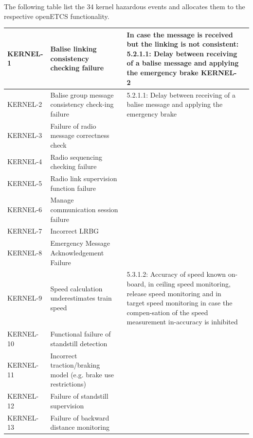 \documentclass{template/openetcs_report}
\begin{document}
The following table list the 34 kernel hazardous events and allocates them to the respective openETCS functionality. 


\begin{center}
\label{tab:KernelHaz}
\tablelasttail{\hline}

\begin{supertabular}[t]{|p{2cm}|p{4cm}|p{4cm}|p{4cm}|}
\hline KERNEL-1 & Balise linking consistency checking failure & In case the message is received but the linking is not consistent:
5.2.1.1: Delay between receiving of a balise message and applying the emergency brake
KERNEL-2 &  \\ 
\hline KERNEL-2 & Balise group message consistency check-ing failure  & 5.2.1.1: Delay between receiving of a balise message and applying the emergency brake &  \\ 
\hline KERNEL-3 & Failure of radio message correctness check &  &  \\ 
\hline KERNEL-4 & Radio sequencing checking failure &  &  \\ 
\hline KERNEL-5 & Radio link supervision function failure &  &  \\ 
\hline KERNEL-6 & Manage communication session failure &  &  \\ 
\hline KERNEL-7 & Incorrect LRBG &  &  \\ 
\hline KERNEL-8 & Emergency Message Acknowledgement Failure &  &  \\ 
\hline KERNEL-9 & Speed calculation underestimates train speed & 5.3.1.2: Accuracy of speed known on-board, in ceiling speed monitoring, release speed monitoring and in target speed monitoring in case the compen-sation of the speed measurement in-accuracy is inhibited  &  \\ 
\hline KERNEL-10 & Functional failure of standstill detection &  &  \\ 
\hline KERNEL-11 & Incorrect traction/braking model (e.g. brake use restrictions) &  &  \\ 
\hline KERNEL-12 & Failure of standstill supervision &  &  \\ 
\hline KERNEL-13 & Failure of backward distance monitoring &  &  \\ 

\end{supertabular}
\end{center}
\end{document}
